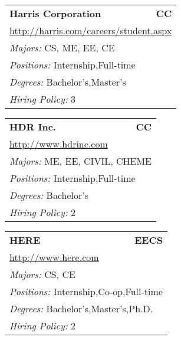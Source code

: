 \documentclass[twoside]{article}
\begin{document}
\begin{center}
\begin{multicols}{3}
\begin{FlushLeft}
\begin{minipage}{.9\columnwidth}
\end{minipage}
 
\begin{minipage}{.9\columnwidth}\begin{tabularx}{.95\columnwidth}{Xr}
                 {\Large\bf Harris Corporation} & {\Large\bf CC}\\
    \multicolumn{2}{p{.95\columnwidth}}{\url{http://harris.com/careers/student.aspx}}\\
    \multicolumn{2}{p{.95\columnwidth}}{\emph{Majors:} CS, ME, EE, CE}\\
    \multicolumn{2}{p{.95\columnwidth}}{\emph{Positions:} Internship,Full-time}\\
    \multicolumn{2}{p{.95\columnwidth}}{\emph{Degrees:} Bachelor's,Master's}\\
    \multicolumn{2}{p{.95\columnwidth}}{\emph{Hiring Policy:} 3}\\
    \end{tabularx}
    
\end{minipage}
 
\begin{minipage}{.9\columnwidth}\begin{tabularx}{.95\columnwidth}{Xr}
                 {\Large\bf HDR Inc.} & {\Large\bf CC}\\
    \multicolumn{2}{p{.95\columnwidth}}{\url{http://www.hdrinc.com}}\\
    \multicolumn{2}{p{.95\columnwidth}}{\emph{Majors:} ME, EE, CIVIL, CHEME}\\
    \multicolumn{2}{p{.95\columnwidth}}{\emph{Positions:} Internship,Full-time}\\
    \multicolumn{2}{p{.95\columnwidth}}{\emph{Degrees:} Bachelor's}\\
    \multicolumn{2}{p{.95\columnwidth}}{\emph{Hiring Policy:} 2}\\
    \end{tabularx}
    
\end{minipage}
 
\begin{minipage}{.9\columnwidth}\begin{tabularx}{.95\columnwidth}{Xr}
                 {\Large\bf HERE} & {\Large\bf EECS}\\
    \multicolumn{2}{p{.95\columnwidth}}{\url{http://www.here.com}}\\
    \multicolumn{2}{p{.95\columnwidth}}{\emph{Majors:} CS, CE}\\
    \multicolumn{2}{p{.95\columnwidth}}{\emph{Positions:} Internship,Co-op,Full-time}\\
    \multicolumn{2}{p{.95\columnwidth}}{\emph{Degrees:} Bachelor's,Master's,Ph.D.}\\
    \multicolumn{2}{p{.95\columnwidth}}{\emph{Hiring Policy:} 2}\\
    \end{tabularx}
    

\end{minipage}
\end{FlushLeft}
\end{multicols}
\end{center}
\end{document}
